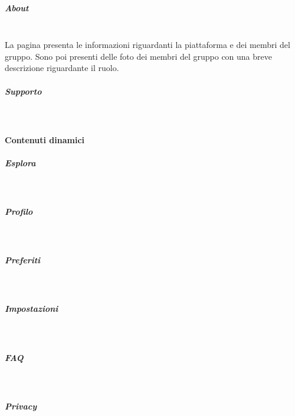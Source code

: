 \subparagraph{About} 
~\\	
La pagina presenta le informazioni riguardanti la piattaforma e dei membri del gruppo. Sono poi presenti delle foto dei membri del gruppo con una breve descrizione riguardante il ruolo.
~\\	
\subparagraph{Supporto} 

~\\

\paragraph{Contenuti dinamici}   
\subparagraph{Esplora}

~\\
\subparagraph{Profilo}

~\\
\subparagraph{Preferiti}

~\\
\subparagraph{Impostazioni} 

~\\
\subparagraph{FAQ} 

~\\

\subparagraph{Privacy} 

~\\














